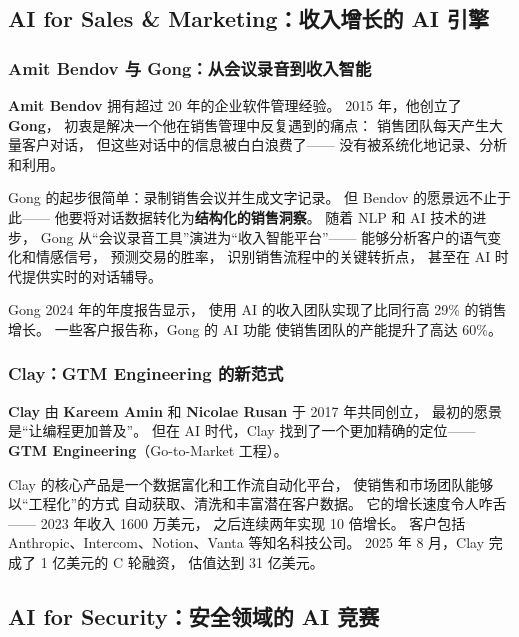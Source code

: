 \subsection{AI for Sales \& Marketing：收入增长的 AI 引擎}
\label{subsec:sales-ai}

\subsubsection{Amit Bendov 与 Gong：从会议录音到收入智能}

\textbf{Amit Bendov} 拥有超过 20 年的企业软件管理经验。
2015 年，他创立了 \textbf{Gong}，
初衷是解决一个他在销售管理中反复遇到的痛点：
销售团队每天产生大量客户对话，
但这些对话中的信息被白白浪费了——
没有被系统化地记录、分析和利用。

Gong 的起步很简单：录制销售会议并生成文字记录。
但 Bendov 的愿景远不止于此——
他要将对话数据转化为\textbf{结构化的销售洞察}。
随着 NLP 和 AI 技术的进步，
Gong 从``会议录音工具''演进为``收入智能平台''——
能够分析客户的语气变化和情感信号，
预测交易的胜率，
识别销售流程中的关键转折点，
甚至在 AI 时代提供实时的对话辅导。

Gong 2024 年的年度报告显示，
使用 AI 的收入团队实现了比同行高 29\% 的销售增长。
一些客户报告称，Gong 的 AI 功能
使销售团队的产能提升了高达 60\%。

\subsubsection{Clay：GTM Engineering 的新范式}

\textbf{Clay} 由 \textbf{Kareem Amin} 和 \textbf{Nicolae Rusan}
于 2017 年共同创立，
最初的愿景是``让编程更加普及''。
但在 AI 时代，Clay 找到了一个更加精确的定位——
\textbf{GTM Engineering}（Go-to-Market 工程）。

Clay 的核心产品是一个数据富化和工作流自动化平台，
使销售和市场团队能够以``工程化''的方式
自动获取、清洗和丰富潜在客户数据。
它的增长速度令人咋舌——
2023 年收入 1600 万美元，
之后连续两年实现 10 倍增长。
客户包括 Anthropic、Intercom、Notion、Vanta 等知名科技公司。
2025 年 8 月，Clay 完成了 1 亿美元的 C 轮融资，
估值达到 31 亿美元。


\subsection{AI for Security：安全领域的 AI 竞赛}
\label{subsec:security-ai}

